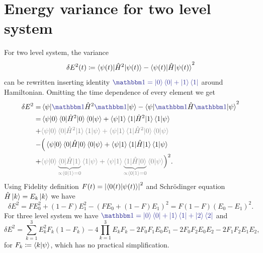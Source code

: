 \section{Energy variance for two level system}
For two level system, the variance
\begin{equation}
    \delta E^2(t)\coloneqq \braket{\psi(t)|\hat{H}^2|\psi(t)}-\braket{\psi(t)|\hat{H}|\psi(t)}^2
\end{equation}
can be rewritten inserting identity $\bluee{\Id=\ket{0}\bra{0}+\ket{1}\bra{1}}$ around Hamiltonian. Omitting the time dependence of every element we get
\begin{equation}
    \begin{split}
        \delta E^2 =& \braket{\psi|\bluee{\Id}\HH^2\bluee{\Id}|\psi}-\braket{\psi|\bluee{\Id}\HH\bluee{\Id}|\psi}^2\\
        =&\braket{\psi|0}\braket{0|\HH^2|0}\braket{0|\psi}+\braket{\psi|1}\braket{1|\HH^2|1}\braket{1|\psi}\\
        +&\textcolor{gray}{\braket{\psi|0}\braket{0|\HH^2|1}\braket{1|\psi}+\braket{\psi|1}\braket{1|\HH^2|0}\braket{0|\psi}}\\
        -&\Big(\braket{\psi|0}\braket{0|\HH|0}\braket{0|\psi}+\braket{\psi|1}\braket{1|\HH|1}\braket{1|\psi}\\
        +&\textcolor{gray}{\braket{\psi|0}\underbrace{\braket{0|\HH|1}}_{\propto \braket{0|1}=0}\braket{1|\psi}+\braket{\psi|1}\underbrace{\braket{1|\HH|0}}_{\propto \braket{0|1}=0}\braket{0|\psi}}\Big)^2.
    \end{split}
\end{equation}
Using Fidelity definition $F(t)=\left|\braket{0(t)|\psi(t)}\right|^2$ and Schr\"odinger equation $\hat{H}\ket{k}=E_k\ket{k}$ we have
\begin{equation}
    \delta E^2 = FE_0^2+(1-F)E_1^2 - (FE_0+(1-F)E_1)^2 = F(1-F)(E_0-E_1)^2.
\end{equation}
For three level system we have $\bluee{\Id=\ket{0}\bra{0}+\ket{1}\bra{1}+\ket{2}\bra{2}}$ and
\begin{equation}
    \delta E^2=\sum_{k=1}^3 E_k^2 F_k(1-F_k)-4\prod_{k=1}^3 E_kF_k-2F_0F_1E_0E_1-2F_0F_2E_0E_2-2F_1F_2E_1E_2,
\end{equation}
for $F_k\coloneqq \braket{k|\psi}$, which has no practical simplification.











